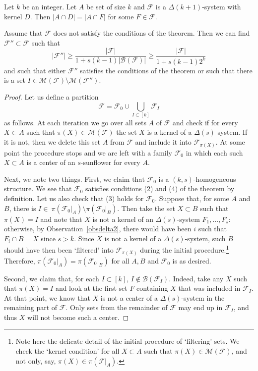 \documentclass[10pt,a4paper]{amsart}
\newcommand{\ff}{\mathcal{F}}
\newcommand{\m}{\mathcal}
\renewcommand{\ge}{\geqslant}
\begin{document}
\begin{obs}\label{obsdelta2} Let $k$ be an integer. Let $A$ be set of size $k$ and $\m F$ is a $\Delta(k+1)$-system with kernel $D$. Then $|A\cap D| = |A\cap F|$ for some $F\in \m F$.
\end{obs}

    \begin{lem}\label{lemfur1} Assume that $\ff$ does not satisfy the conditions of the theorem. Then we can find $\ff''\subset \ff$ such that $$|\ff''|\ge \frac{|\ff|}{1+s(k-1)|\m B(\ff)|}\ge \frac{|\ff|}{1+s(k-1)2^{k}}$$ and such that either $\ff''$ satisfies the conditions of the theorem or such that there is a set $I\in \m M(\ff)\setminus \m M(\ff'')$.\end{lem}

    \begin{proof}
      Let us define a partition
      $$\ff = \ff_0\cup \bigcup_{I\subset [k]}\ff_I$$
      as follows. At each iteration we go over all sets $A$ of $\ff$ and check if for every $X\subset A$ such that $\pi(X)\in \m M(\ff)$ the set $X$ is a kernel of a $\Delta(s)$-system. If it is not, then we delete this set $A$ from $\ff$ and include it into $\ff_{\pi(X)}$. At some point the procedure stops and we are left with a family $\ff_0$ in which each such $X\subset A$ is a center of an $s$-sunflower for every $A$.

      Next, we note two things. First, we claim that $\ff_0$ is a $(k,s)$-homogeneous structure. We see that $\ff_0$ satisfies conditions (2) and (4) of the theorem by definition. Let us also check that (3) holds for $\ff_0$. Suppose that, for some $A$ and $B$, there is $I\in \ \pi(\ff_0|_A)\setminus \pi(\ff_0|_B)$. Then take the set $X\subset B$ such that $\pi(X)=I$ and note that $X$ is not a kernel of an $\Delta(s)$-system $F_1,\ldots, F_s$: otherwise, by Observation~\ref{obsdelta2}, there would have been $i$ such that $F_i\cap B = X$ since $s>k$. Since $X$ is not a kernel of a $\Delta(s)$-system, such $B$ should have then been `filtered' into $\ff_{\pi(X)}$ during the initial procedure.\footnote{Note here the delicate detail of the initial procedure of `filtering' sets. We check the `kernel condition' for all $X\subset A$ such that $\pi(X)\in \m M(\ff)$, and not only, say, $\pi(X)\in \pi(\ff|_A)$.}  Therefore, $\pi(\ff_0|_A)= \pi(\ff_0|_B)$ for all $A,B$ and $\ff_0$ is as desired.


       Second, we claim that, for each $I\subset [k]$, $I\notin \m B(\ff_{I})$. Indeed, take any $X$ such that $\pi(X) = I$ and look at the first set $F$ containing $X$ that was included in $\ff_I$. At that point, we know that $X$ is not a center of a $\Delta(s)$-system in the remaining part of $\ff$. Only sets from the remainder of $\ff$ may end up in $\ff_I$, and thus $X$ will not become such a center.


\end{proof}
\end{document}
